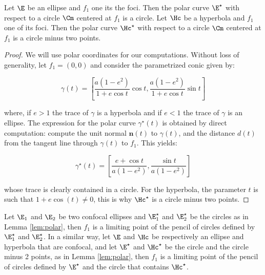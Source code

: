 \begin{lemma}
Let $\E$ be an ellipse and $f_1$ one its the foci. Then the polar curve $\E^{\star}$ with respect to a circle $\Cm$ centered at $f_1$ is a circle. Let $\Hc$ be a hyperbola and $f_1$ one of its foci. Then the polar curve $\Hc^{\star}$ with respect to a circle $\Cm$ centered at $f_1$ is a circle minus two points.
\label{lem:polar}
\end{lemma}
\begin{proof}

We will use polar coordinates for our computations. Without loss of generality, let $f_{1}=(0,0)$ and consider the parametrized conic given by:

\[ \gamma(t)=\left[\frac{a(1-e^2)}{1+e\cos{t}}\cos{t}, \frac{a(1-e^2)}{1+e\cos{t}}\sin{t}\right] \]

\noindent where, if $e>1$ the trace of $\gamma$ is a hyperbola and if $e<1$ the trace of $\gamma$ is an ellipse. The expression for the polar curve $\gamma^{\star}(t)$ is obtained by direct computation: compute the unit normal $\mathbf{n}(t)$ to $\gamma(t)$, and  the distance $d(t)$ from the tangent line through $\gamma(t)$ to $f_{1}$. This yields:
 
\[ \gamma^{\star}(t)=\left[\frac{e+\cos{t}}{a(1-e^2)},\frac{\sin{t}}{a(1-e^2)}\right] \]

\noindent whose trace is clearly contained in a circle. For the hyperbola, the parameter $t$ is such that $1+e\cos(t) \neq 0 $, this is why $\Hc^{\star}$ is a circle minus two points.
  
\end{proof}     


\begin{lemma}
\label{lem:limit-focus}
Let $\E_{1}$ and $\E_{2}$ be two confocal ellipses and $\E_{1}^{\star}$ and $\E_{2}^{\star}$ be the circles as in Lemma \ref{lem:polar}, then $f_{1}$ is a limiting point of the pencil of circles defined by $\E_{1}^{\star}$ and $\E_{2}^{\star}$. In a similar way, let $\E$ and $\Hc$ be respectively an ellipse and hyperbola that are confocal, and let $\E^{\star}$ and $\Hc^{\star}$ be the circle and the circle minus 2 points, as in Lemma \ref{lem:polar}, then $f_{1}$ is a limiting point of the pencil of circles defined by $\E^{\star}$ and the circle that contains $\Hc^{\star}$.
\end{lemma}

